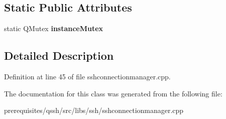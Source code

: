 \subsection*{Static Public Attributes}
\begin{DoxyCompactItemize}
\item 
\mbox{\label{class_q_ssh_1_1_internal_1_1_ssh_connection_manager_private_a7bab855484eb8499d248c329f3dc1cb5}} 
static Q\+Mutex {\bfseries instance\+Mutex}
\end{DoxyCompactItemize}


\subsection{Detailed Description}


Definition at line 45 of file sshconnectionmanager.\+cpp.



The documentation for this class was generated from the following file\+:\begin{DoxyCompactItemize}
\item 
prerequisites/qssh/src/libs/ssh/sshconnectionmanager.\+cpp\end{DoxyCompactItemize}
